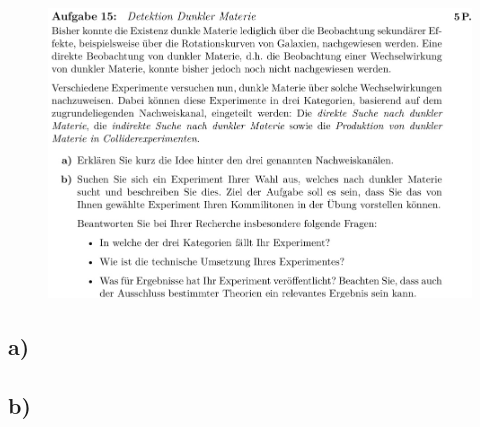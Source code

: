     \begin{figure}[H]
        \centering
        \includegraphics[width=\textwidth]{images/Aufgabe15.jpg}
        \label{fig:4}
    \end{figure}

\subsection{a)}

\subsection{b)}

